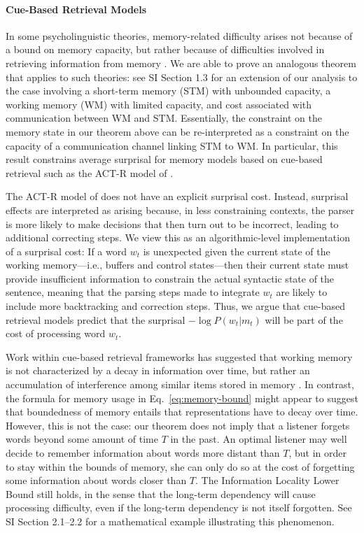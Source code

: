 \paragraph{Cue-Based Retrieval Models}

In some psycholinguistic theories, memory-related difficulty arises not because of a bound on memory capacity, but rather because of difficulties involved in retrieving information from memory \citep{mcelree2000sentence,lewis-activation-based-2005,nicenboim2018models,vasishth2019computational}. We are able to prove an analogous theorem that applies to such theories: see SI Section 1.3 for an extension of our analysis to the case involving a short-term memory (STM) with unbounded capacity, a working memory (WM) with limited capacity, and cost associated with communication between WM and STM. Essentially, the constraint on the memory state in our theorem above can be re-interpreted as a constraint on the capacity of a communication channel linking STM to WM. In particular, this result constrains average surprisal for memory models based on cue-based retrieval such as the ACT-R model of \citet{lewis-activation-based-2005}.

The ACT-R model of \cite{lewis-activation-based-2005} does not have an explicit surprisal cost.
Instead, surprisal effects are interpreted as arising because, in less constraining contexts, the parser is more likely to make decisions that then turn out to be incorrect, leading to additional correcting steps.
We view this as an algorithmic-level implementation of a surprisal cost:
If a word $w_t$ is unexpected given the current state of the working memory---i.e., buffers and control states---then their current state must provide insufficient information to constrain the actual syntactic state of the sentence, meaning that the parsing steps made to integrate $w_t$ are likely to include more backtracking and correction steps.
Thus, we argue that cue-based retrieval models predict that the surprisal $- \log P(w_t|m_t)$ will be part of the cost of processing word $w_t$.

Work within cue-based retrieval frameworks has suggested that working memory is not characterized by a decay in information over time, but rather an accumulation of interference among similar items stored in memory \citep[][p. 408]{lewis-activation-based-2005}.
In contrast, the formula for memory usage in Eq.~\ref{eq:memory-bound} might appear to suggest that boundedness of memory entails that representations have to decay over time.
However, this is not the case:
our theorem does not imply that a listener forgets words beyond some amount of time $T$ in the past. 
An optimal listener may well decide to remember information about words more distant than $T$, but in order to stay within the bounds of memory, she can only do so at the cost of forgetting some information about words closer than $T$.
The Information Locality Lower Bound still holds, in the sense that the long-term dependency will cause processing difficulty, even if the long-term dependency is not itself forgotten.
See SI Section 2.1--2.2 for a mathematical example illustrating this phenomenon.

